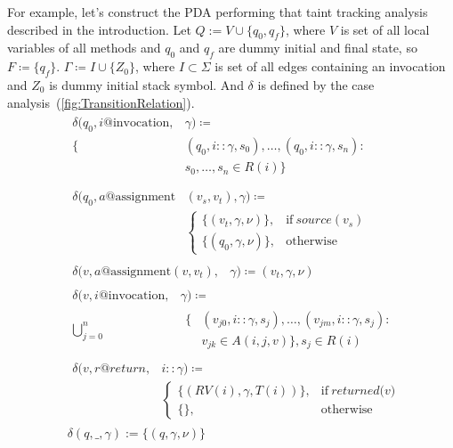For example, let's construct the PDA performing that taint tracking analysis described in the introduction.
Let $Q := V \cup \{q_0, q_f\}$, where $V$ is set of all local variables of all methods and $q_0$ and $q_f$ are dummy initial and final state, so $F \coloneqq \{q_f\}$.
$\Gamma \coloneqq I \cup \{Z_0\}$, where $I \subset \Sigma$ is set of all edges containing an invocation and $Z_0$ is dummy initial stack symbol.
And $\delta$ is defined by the case analysis~(\ref{fig:TransitionRelation}).
\begin{equation}
	\label{fig:TransitionRelation}
	\begin{split}
		&\begin{split}
			\delta(q_0, i@\textrm{invocation}, & \gamma) \coloneqq \\
			\{& (q_0, i::\gamma, s_0), \ldots, (q_0, i::\gamma, s_n): \\
			& s_0, \ldots, s_n \in R(i)\} \\
		\end{split} \\
		&\begin{split}
			\delta(q_0, a@\textrm{assignment} & (v_s, v_t), \gamma) \coloneqq \\
			&\begin{cases}
				\{(v_t, \gamma, \nu)\},& \textrm{if}\ \textit{source}(v_s) \\
				\{(q_0, \gamma, \nu)\},& \textrm{otherwise}
			\end{cases}
		\end{split} \\
		&\begin{split}
			\delta(v, a@\textrm{assignment}(v, v_t), & \gamma) \coloneqq {(v_t, \gamma, \nu)}
		\end{split} \\
		&\begin{split}
			\delta(v, i@\textrm{invocation}, & \gamma) \coloneqq \\
			\bigcup_{j=0}^{n} 
			&\begin{split}
				\{&(v_{j0}, i::\gamma, s_j), \ldots, (v_{jm}, i::\gamma, s_j): \\
				& v_{jk} \in A(i, j, v)\}, s_j \in R(i)
			\end{split}
		\end{split} \\
		&\begin{split}
			\delta(v, r@return, &i::\gamma) \coloneqq \\
			&\begin{cases}
				\{(RV(i), \gamma, T(i))\},& \textrm{if}\ \textit{returned(v)} \\
				\{\}, & \textrm{otherwise}
			\end{cases}
		\end{split} \\
		&\delta(q, \_, \gamma) := \{(q, \gamma, \nu)\}
	\end{split}
\end{equation}
